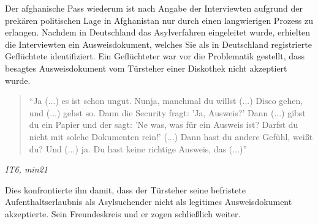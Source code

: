 Der afghanische Pass wiederum ist nach Angabe der Interviewten aufgrund der prekären politischen Lage in Afghanistan nur durch einen langwierigen Prozess zu erlangen.\newline
Nachdem in Deutschland das Asylverfahren eingeleitet wurde, erhielten die Interviewten ein Ausweisdokument, welches Sie als in Deutschland registrierte Geflüchtete identifiziert. Ein Geflüchteter war vor die Problematik gestellt, dass besagtes Ausweisdokument vom Türsteher einer Diskothek nicht akzeptiert wurde.
\begin{quote}
    ``Ja (...) es ist schon ungut. Nunja, manchmal du willst (...) Disco gehen, und (...) gehst so. Dann die Security fragt: 'Ja, Ausweis?' Dann (...) gibst du ein Papier und der sagt: 'Ne was, was für ein Ausweis ist? Darfst du nicht mit solche Dokumenten rein!' (...) Dann hast du andere Gefühl, weißt du? Und (...) ja. Du hast keine richtige Ausweis, das (...)''
\end{quote}
\centerline{\textit{IT6, min21}}
Dies konfrontierte ihn damit, dass der Türsteher seine befristete Aufenthaltserlaubnis als Asylsuchender nicht als legitimes Ausweisdokument akzeptierte. Sein Freundeskreis und er zogen schließlich weiter.

